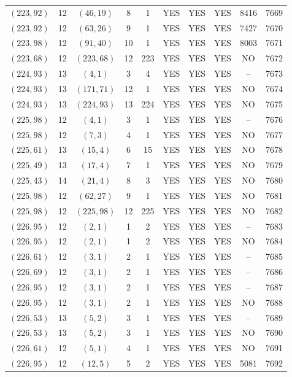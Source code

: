 \begin{longtable}{|c|c|c|c|c|c|c|c|c|c|}
$(223, 92)$ & 12 & $(46, 19)$ & 8 & 1 & YES & YES & YES & 8416 & 7669\\
$(223, 92)$ & 12 & $(63, 26)$ & 9 & 1 & YES & YES & YES & 7427 & 7670\\
$(223, 98)$ & 12 & $(91, 40)$ & 10 & 1 & YES & YES & YES & 8003 & 7671\\
$(223, 68)$ & 12 & $(223, 68)$ & 12 & 223 & YES & YES & YES & NO & 7672\\
$(224, 93)$ & 13 & $(4, 1)$ & 3 & 4 & YES & YES & YES & -- & 7673\\
$(224, 93)$ & 13 & $(171, 71)$ & 12 & 1 & YES & YES & YES & NO & 7674\\
$(224, 93)$ & 13 & $(224, 93)$ & 13 & 224 & YES & YES & YES & NO & 7675\\
$(225, 98)$ & 12 & $(4, 1)$ & 3 & 1 & YES & YES & YES & -- & 7676\\
$(225, 98)$ & 12 & $(7, 3)$ & 4 & 1 & YES & YES & YES & NO & 7677\\
$(225, 61)$ & 13 & $(15, 4)$ & 6 & 15 & YES & YES & YES & NO & 7678\\
$(225, 49)$ & 13 & $(17, 4)$ & 7 & 1 & YES & YES & YES & NO & 7679\\
$(225, 43)$ & 14 & $(21, 4)$ & 8 & 3 & YES & YES & YES & NO & 7680\\
$(225, 98)$ & 12 & $(62, 27)$ & 9 & 1 & YES & YES & YES & NO & 7681\\
$(225, 98)$ & 12 & $(225, 98)$ & 12 & 225 & YES & YES & YES & NO & 7682\\
$(226, 95)$ & 12 & $(2, 1)$ & 1 & 2 & YES & YES & YES & -- & 7683\\
$(226, 95)$ & 12 & $(2, 1)$ & 1 & 2 & YES & YES & YES & NO & 7684\\
$(226, 61)$ & 12 & $(3, 1)$ & 2 & 1 & YES & YES & YES & -- & 7685\\
$(226, 69)$ & 12 & $(3, 1)$ & 2 & 1 & YES & YES & YES & -- & 7686\\
$(226, 95)$ & 12 & $(3, 1)$ & 2 & 1 & YES & YES & YES & -- & 7687\\
$(226, 95)$ & 12 & $(3, 1)$ & 2 & 1 & YES & YES & YES & NO & 7688\\
$(226, 53)$ & 13 & $(5, 2)$ & 3 & 1 & YES & YES & YES & -- & 7689\\
$(226, 53)$ & 13 & $(5, 2)$ & 3 & 1 & YES & YES & YES & NO & 7690\\
$(226, 61)$ & 12 & $(5, 1)$ & 4 & 1 & YES & YES & YES & NO & 7691\\
$(226, 95)$ & 12 & $(12, 5)$ & 5 & 2 & YES & YES & YES & 5081 & 7692\\

\end{longtable}

